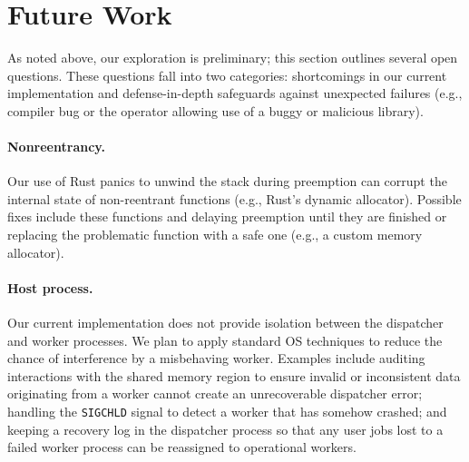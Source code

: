 \section{Future Work}
\label{sec:future}

As noted above, our exploration is preliminary; this section outlines several
open questions.  These questions fall into two categories: shortcomings in our
current implementation and defense-in-depth safeguards against unexpected
failures (e.g., compiler bug or the operator allowing use of a buggy or malicious library).


\paragraph{Nonreentrancy.}
Our use of Rust panics to unwind the stack during preemption can
corrupt the internal state of non-reentrant functions (e.g., Rust's dynamic
allocator).  Possible fixes include  these functions and delaying
preemption until they are finished or replacing the problematic function with a
safe one (e.g., a custom memory allocator).

\paragraph{Host process.}
Our current implementation does not provide isolation between the dispatcher
and worker processes.  We plan to apply standard OS techniques to reduce
the chance of interference by a misbehaving worker.  Examples
include auditing interactions with the shared memory region to ensure invalid
or inconsistent data originating from a worker cannot create an unrecoverable
dispatcher error; handling the \texttt{SIGCHLD} signal to detect a worker that has
somehow crashed; and keeping a recovery log in the dispatcher process so that any
user jobs lost to a failed worker process can be reassigned to operational
workers.  

